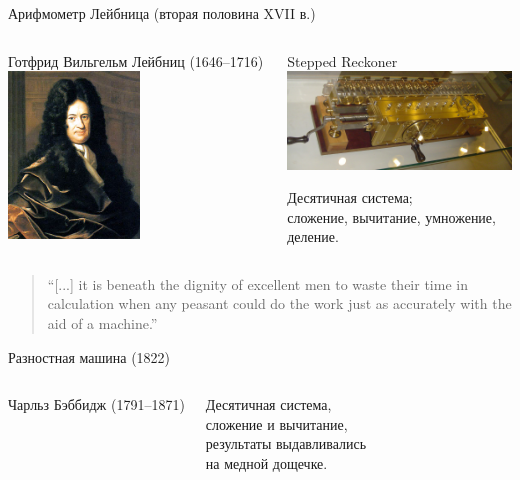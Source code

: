 \begin{frame}{Арифмометр Лейбница (вторая половина XVII в.)}
    \begin{columns}
    \column{3.7cm}
        \begin{block}{\small Готфрид Вильгельм Лейбниц (1646–1716)}
            \centering\includegraphics[width=3.5cm,keepaspectratio]{./images/leibniz.jpg}
        \end{block}

    \column{7.5cm}

\begin{block}{Stepped Reckoner}
            \centering\includegraphics[width=6cm,keepaspectratio]{./images/leibnitzrechenmaschine.jpg}

    \small \par Десятичная система;\\
        сложение, вычитание, умножение, деление.
\end{block}


    \small
    \end{columns}
\begin{quote}
    \small “[...] it is beneath the dignity of excellent men to waste their time in calculation when any peasant could do the work just as accurately with the aid of a machine.”
\end{quote}
\end{frame}

\begin{frame}{Разностная машина (1822)}
    \begin{columns}
    \column{4cm}
        \begin{block}{Чарльз Бэббидж (1791–1871)}
        \end{block}

    \column{7cm}

        Десятичная система,\\
        сложение и вычитание,\\
        результаты выдавливались\\на медной дощечке.
    \end{columns}
\end{frame}

